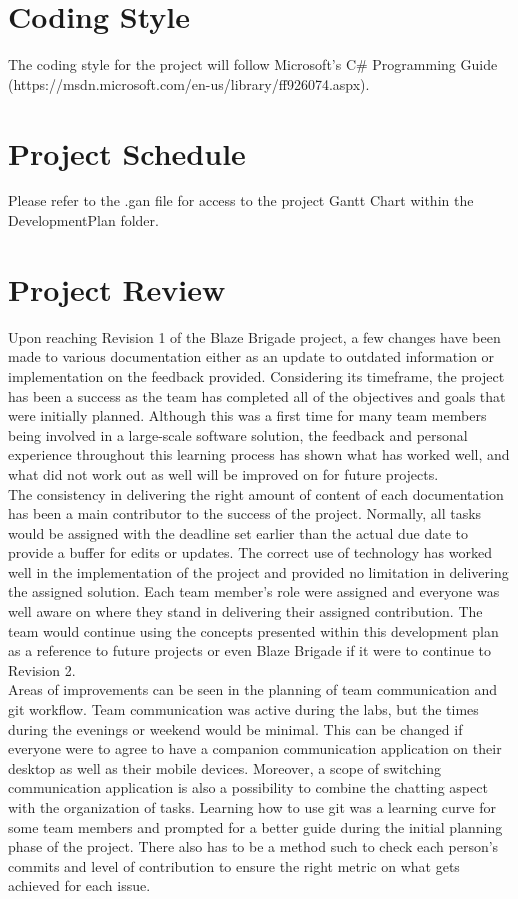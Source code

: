 \documentclass{article}
\begin{document}
\section{Coding Style}
The coding style for the project will follow Microsoft's C\# Programming Guide (https://msdn.microsoft.com/en-us/library/ff926074.aspx).
	
\section{Project Schedule}
Please refer to the .gan file for access to the project Gantt Chart within the DevelopmentPlan folder.
	
\section{Project Review}
Upon reaching Revision 1 of the Blaze Brigade project, a few changes have been made to various documentation either as an update to outdated information or implementation on the feedback provided. Considering its timeframe, the project has been a success as the team has completed all of the objectives and goals that were initially planned. Although this was a first time for many team members being involved in a large-scale software solution, the feedback and personal experience throughout this learning process has shown what has worked well, and what did not work out as well will be improved on for future projects. \\

\noindent
The consistency in delivering the right amount of content of each documentation has been a main contributor to the success of the project. Normally, all tasks would be assigned with the deadline set earlier than the actual due date to provide a buffer for edits or updates. The correct use of technology has worked well in the implementation of the project and provided no limitation in delivering the assigned solution. Each team member's role were assigned and everyone was well aware on where they stand in delivering their assigned contribution. The team would continue using the concepts presented within this development plan as a reference to future projects or even Blaze Brigade if it were to continue to Revision 2. \\

\noindent
Areas of improvements can be seen in the planning of team communication and git workflow. Team communication was active during the labs, but the times during the evenings or weekend would be minimal. This can be changed if everyone were to agree to have a companion communication application on their desktop as well as their mobile devices. Moreover, a scope of switching communication application is also a possibility to combine the chatting aspect with the organization of tasks. Learning how to use git was a learning curve for some team members and prompted for a better guide during the initial planning phase of the project. There also has to be a method such to check each person's commits and level of contribution to ensure the right metric on what gets achieved for each issue. \\
\end{document}
